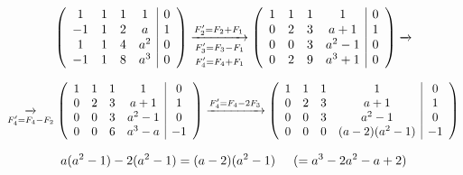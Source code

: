 \documentclass[12pt]{article}
\begin{document}
\begin{ejercicio}[4 puntos]
\begin{enumerate}
        $$
        \left(\begin{array}{cccc|c}
        1 & 1 & 1 & 1 & 0 \\
        -1 & 1 & 2 & a & 1 \\
        1 & 1 & 4 & a^2 & 0 \\
        -1 & 1 & 8 & a^3 & 0 \\
        \end{array}\right) 
        \underset{\begin{subarray}{c}
          F_3' = F_3 - F_1 \\
          \vspace{-0.05cm} \\
          F_4' = F_4 + F_1
          \end{subarray}}{\xrightarrow{F_2' = F_2 + F_1}}
        \left(\begin{array}{cccc|c}
        1 & 1 & 1 & 1       & 0 \\
        0 & 2 & 3 & a+1     & 1 \\
        0 & 0 & 3 & a^2 - 1 & 0 \\
        0 & 2 & 9 & a^3 + 1 & 0 \\
        \end{array}\right) \xrightarrow{}
        $$

        \[
        \underset{\begin{subarray}{c}
          F_4' = F_4 - F_2
          \end{subarray}}{\xrightarrow{}}
        \left(\begin{array}{cccc|c}
        1 & 1 & 1 & 1     & 0 \\
        0 & 2 & 3 & a+1   & 1 \\
        0 & 0 & 3 & a^2-1 & 0 \\
        0 & 0 & 6 & a^3-a & -1 \\
        \end{array}\right)
        \xrightarrow{F_4' = F_4 - 2F_3}
        \left(\begin{array}{cccc|c}
        1 & 1 & 1 & 1            & 0 \\
        0 & 2 & 3 & a+1          & 1 \\
        0 & 0 & 3 & a^2-1        & 0 \\
        0 & 0 & 0 & (a-2)(a^2-1) & -1 \\
        \end{array}\right)
        \]

        $$a(a^2-1) - 2(a^2-1) = (a-2)(a^2-1) \hspace{0.5cm} (=a^3 - 2a^2 - a + 2)$$


\end{enumerate}
\end{ejercicio}
\end{document}
